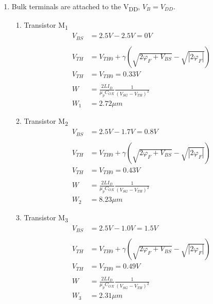 \documentclass{article}
\begin{document}
\begin{enumerate}
\item Bulk terminals are attached to the V\textsubscript{DD}, \(V_{B} = V_{DD}\).
\begin{enumerate}
\item Transistor M\textsubscript{1}
\begin{equation*}
\begin{aligned}
V_{BS} &= 2.5 V - 2.5 V = 0 V \\
\\
V_{TH} &= V_{TH0} + \gamma{}(\sqrt{2\varphi_{F} + V_{BS}} - \sqrt{|2\varphi_{F}|}) \\
V_{TH} &= V_{TH0} = 0.33 V \\
\\
W &= \frac{2LI_{D}}{\mu_{p}C_{OX}}\frac{1}{(V_{SG} - V_{TH})^{2}} \\
W_{1} &= 2.72 \mu{}m
\end{aligned}
\end{equation*}

\item Transistor M\textsubscript{2}
\begin{equation*}
\begin{aligned}
V_{BS} &= 2.5 V - 1.7 V = 0.8 V \\
\\
V_{TH} &= V_{TH0} + \gamma{}(\sqrt{2\varphi_{F} + V_{BS}} - \sqrt{|2\varphi_{F}|}) \\
V_{TH} &= V_{TH0} = 0.43 V \\
\\
W &= \frac{2LI_{D}}{\mu_{p}C_{OX}}\frac{1}{(V_{SG} - V_{TH})^{2}} \\
W_{2} &= 8.23 \mu{}m
\end{aligned}
\end{equation*}

\item Transistor M\textsubscript{3}
\begin{equation*}
\begin{aligned}
V_{BS} &= 2.5 V - 1.0 V = 1.5 V \\
\\
V_{TH} &= V_{TH0} + \gamma{}(\sqrt{2\varphi_{F} + V_{BS}} - \sqrt{|2\varphi_{F}|}) \\
V_{TH} &= V_{TH0} = 0.49 V \\
\\
W &= \frac{2LI_{D}}{\mu_{p}C_{OX}}\frac{1}{(V_{SG} - V_{TH})^{2}} \\
W_{3} &= 2.31 \mu{}m
\end{aligned}
\end{equation*}
\end{enumerate}
\end{enumerate}
\end{document}
